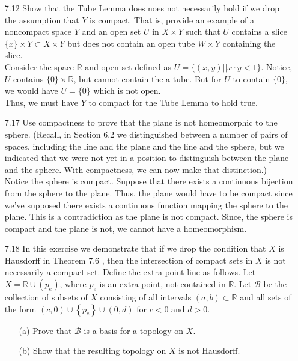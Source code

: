 \documentclass[12pt]{article}
\newcommand{\R}{\mathbb{R}}
\newcommand{\B}{\mathcal{B}}
\begin{document}
\begin{enumerate}
		\item[7.12] Show that the Tube Lemma does noes not necessarily hold if we drop the assumption that $Y$ is compact. That is, provide an example of a noncompact space $Y$ and
		an open set $U$ in $X \times Y$ such that $U$ contains a slice $\{ x \} \times Y \subset X \times Y$ but does not contain an open tube $W \times Y$ containing the slice.\\
		Consider the space $ \R $ and open set defined as $ U = \{(x,y)||x\cdot y < 1\} $. Notice, $ U $ contains $ \{0\}\times \R $, but cannot contain the a tube. But for $ U $ to contain $ \{0\} $, we would have $ U =\{0\} $ which is not open.\\
		 Thus, we must have $ Y $ to compact for the Tube Lemma to hold true.
		
		\item[7.17] Use compactness to prove that the plane is not homeomorphic to the sphere.
		(Recall, in Section 6.2 we distinguished between a number of pairs of spaces, including the line and the plane and the line and the sphere, but we indicated that we were not yet in a position to distinguish between the plane and the sphere. With compactness, we can now make that distinction.)\\
		Notice the sphere is compact. Suppose that there exists a continuous bijection from the sphere to the plane. Thus, the plane would have to be compact since we've supposed there exists a continuous function mapping the sphere to the plane. This is a contradiction as the plane is not compact. Since, the sphere is compact and the plane is not, we cannot have a homeomorphism.
		
		\item[7.18] In this exercise we demonstrate that if we drop the condition that $X$ is Hausdorff in Theorem 7.6 , then the intersection of compact sets in $X$ is not necessarily a compact set. Define the extra-point line as follows. Let $X = \mathbb { R } \cup \left( p _ { e } \right)$, where $p _ { e }$ is an extra point, not contained in $\mathbb { R }$. Let $\B$ be the collection of	subsets of $X$ consisting of all intervals $( a , b ) \subset \mathbb { R }$ and all sets of the form $( c , 0 ) \cup \left\{ p _ { e } \right\} \cup ( 0 , d )$ for $c < 0$ and $d > 0$.\\
		\begin{enumerate}
			\item[(a)] Prove that $\mathcal { B }$ is a basis for a topology on $X .$
			
			\item[(b)] Show that the resulting topology on $X$ is not Hausdorff.
			

\end{enumerate}
\end{enumerate}
\end{document}
